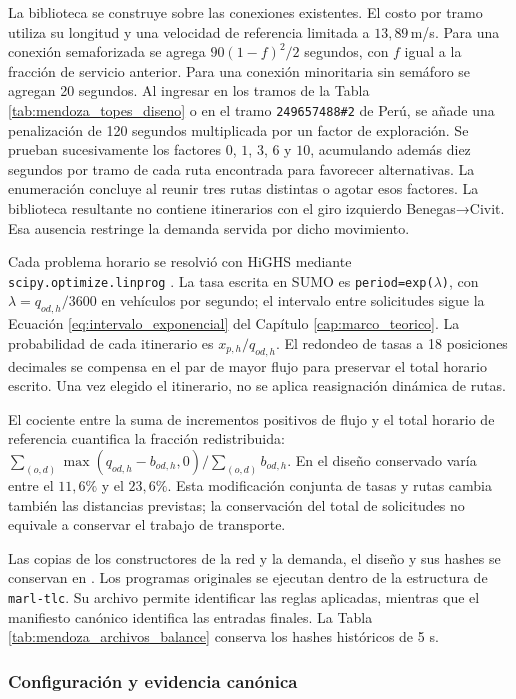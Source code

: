 La biblioteca se construye sobre las conexiones existentes. El costo por tramo utiliza su longitud y una velocidad de referencia limitada a $13{,}89$\,m/s. Para una conexión semaforizada se agrega $90(1-f)^2/2$ segundos, con $f$ igual a la fracción de servicio anterior. Para una conexión minoritaria sin semáforo se agregan 20 segundos. Al ingresar en los tramos de la Tabla \ref{tab:mendoza_topes_diseno} o en el tramo \texttt{249657488\#2} de Perú, se añade una penalización de 120 segundos multiplicada por un factor de exploración. Se prueban sucesivamente los factores $0$, $1$, $3$, $6$ y $10$, acumulando además diez segundos por tramo de cada ruta encontrada para favorecer alternativas. La enumeración concluye al reunir tres rutas distintas o agotar esos factores. La biblioteca resultante no contiene itinerarios con el giro izquierdo Benegas→Civit. Esa ausencia restringe la demanda servida por dicho movimiento.

Cada problema horario se resolvió con HiGHS mediante \texttt{scipy.optimize.linprog} \cite{scipy_linprog_2026}. La tasa escrita en SUMO es \texttt{period=exp($\lambda$)}, con $\lambda=q_{od,h}/3600$ en vehículos por segundo; el intervalo entre solicitudes sigue la Ecuación \ref{eq:intervalo_exponencial} del Capítulo \ref{cap:marco_teorico}. La probabilidad de cada itinerario es $x_{p,h}/q_{od,h}$. El redondeo de tasas a 18 posiciones decimales se compensa en el par de mayor flujo para preservar el total horario escrito. Una vez elegido el itinerario, no se aplica reasignación dinámica de rutas.

El cociente entre la suma de incrementos positivos de flujo y el total horario de referencia cuantifica la fracción redistribuida: $\sum_{(o,d)}\max(q_{od,h}-b_{od,h},0)/\sum_{(o,d)}b_{od,h}$. En el diseño conservado varía entre el $11{,}6\%$ y el $23{,}6\%$. Esta modificación conjunta de tasas y rutas cambia también las distancias previstas; la conservación del total de solicitudes no equivale a conservar el trabajo de transporte.

Las copias de los constructores de la red y la demanda, el diseño y sus hashes se conservan en . Los programas originales se ejecutan dentro de la estructura de \texttt{marl-tlc}. Su archivo permite identificar las reglas aplicadas, mientras que el manifiesto canónico identifica las entradas finales. La Tabla \ref{tab:mendoza_archivos_balance} conserva los hashes históricos de 5 s.

\subsubsection{Configuración y evidencia canónica}
\label{sec:mendoza_evidencia_final}

